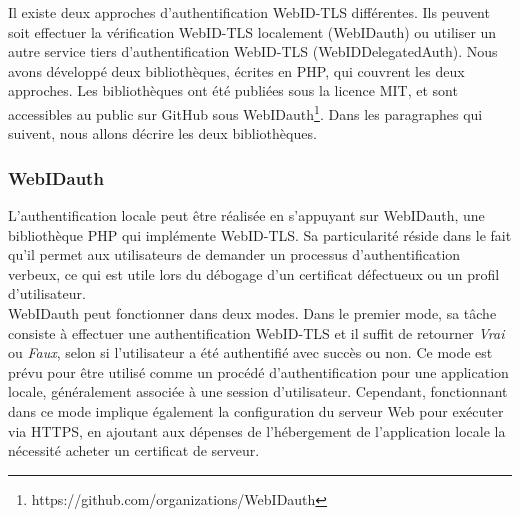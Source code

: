 Il existe deux approches d'authentification WebID-TLS différentes. Ils peuvent soit effectuer la vérification WebID-TLS localement ({WebIDauth}) ou utiliser un autre service tiers d'authentification WebID-TLS (WebIDDelegatedAuth). Nous avons développé deux bibliothèques, écrites en PHP, qui couvrent les deux approches. Les bibliothèques ont été publiées sous la licence MIT, et sont accessibles au public sur GitHub sous WebIDauth\footnote{https://github.com/organizations/WebIDauth}. Dans les paragraphes qui suivent, nous allons décrire les deux bibliothèques.

\subsubsection*{WebIDauth}
L'authentification locale peut être réalisée en s'appuyant sur WebIDauth, une bibliothèque PHP qui implémente WebID-TLS. Sa particularité réside dans le fait qu'il permet aux utilisateurs de demander un processus d'authentification verbeux, ce qui est utile lors du débogage d'un certificat défectueux ou un profil d'utilisateur.\\


WebIDauth peut fonctionner dans deux modes. Dans le premier mode, sa tâche consiste à effectuer une authentification WebID-TLS et il suffit de retourner \textit{Vrai} ou \textit{Faux}, selon si l'utilisateur a été authentifié avec succès ou non. Ce mode est prévu pour être utilisé comme un procédé d'authentification pour une application locale, généralement associée à une session d'utilisateur. Cependant, fonctionnant dans ce mode implique également la configuration du serveur Web pour exécuter via HTTPS, en ajoutant aux dépenses de l'hébergement de l'application locale la nécessité acheter un certificat de serveur.\\



